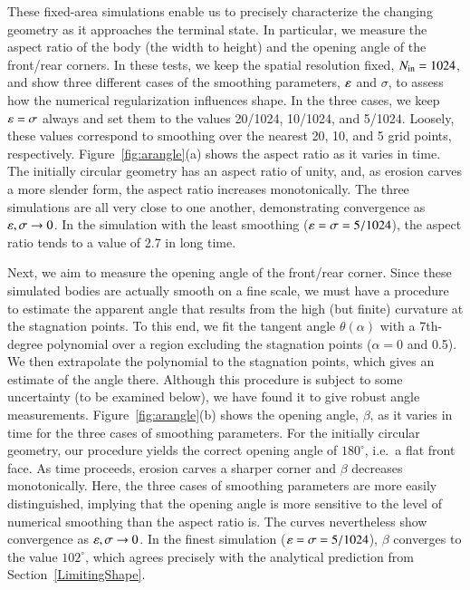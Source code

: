 \documentclass[preprint, 10pt]{elsarticle}
\begin{document}

These fixed-area simulations enable us to precisely characterize the changing geometry as it approaches the terminal state. In particular, we measure the aspect ratio of the body (the width to height) and the opening angle of the front/rear corners. In these tests, we keep the spatial resolution fixed, $N_{\mathrm{in}} = 1024$, and show three different cases of the smoothing parameters, $\varepsilon$ and $\sigma$, to assess how the numerical regularization influences shape. In the three cases, we keep $\varepsilon = \sigma$ always and set them to the values 20/1024, 10/1024, and 5/1024. Loosely, these values correspond to smoothing over the nearest 20, 10, and 5 grid points, respectively. Figure~\ref{fig:arangle}(a) shows the aspect ratio as it varies in time. The initially circular geometry has an aspect ratio of unity, and, as erosion carves a more slender form, the aspect ratio increases monotonically. The three simulations are all very close to one another, demonstrating convergence as $\varepsilon, \sigma \to 0$. In the simulation with the least smoothing ($\varepsilon = \sigma = 5/1024$), the aspect ratio tends to a value of 2.7 in long time.

Next, we aim to measure the opening angle of the front/rear corner. Since these simulated bodies are actually smooth on a fine scale, we must have a procedure to estimate the apparent angle that results from the high (but finite) curvature at the stagnation points. To this end, we fit the tangent angle $\theta(\alpha)$ with a 7th-degree polynomial over a region excluding the stagnation points ($\alpha = 0$ and 0.5). We then extrapolate the polynomial to the stagnation points, which gives an estimate of the angle there. Although this procedure is subject to some uncertainty (to be examined below), we have found it to give robust angle measurements.  Figure~\ref{fig:arangle}(b) shows the opening angle, $\beta$, as it varies in time for the three cases of smoothing parameters.  For the initially circular geometry, our procedure yields the correct opening angle of $180^{\circ}$, i.e.~a flat front face.  As time proceeds, erosion carves a sharper corner and $\beta$ decreases monotonically. Here, the three cases of smoothing parameters are more easily distinguished, implying that the opening angle is more sensitive to the level of numerical smoothing than the aspect ratio is. The curves nevertheless show convergence as $\varepsilon, \sigma \to 0$. In the finest simulation ($\varepsilon = \sigma = 5/1024$), $\beta$ converges to the value $102^{\circ}$, which agrees precisely with the analytical prediction from Section~\ref{LimitingShape}. 
\end{document}
